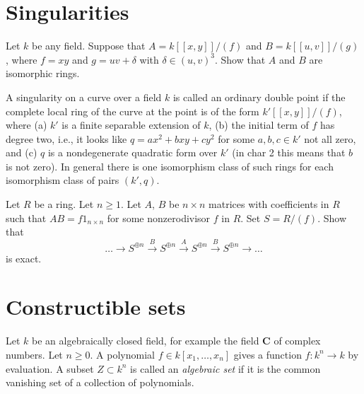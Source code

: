 \section{Singularities}
\label{section-singularities}

\begin{exercise}
\label{exercise-singularities}
Let $k$ be any field. Suppose that $A = k[[x, y]]/(f)$ and
$B = k[[u, v]]/(g)$, where $f = xy$ and $g = uv + \delta$ with
$\delta \in (u, v)^3$. Show that $A$ and $B$ are isomorphic rings.
\end{exercise}

\begin{remark}
\label{remark-singularities}
A singularity on a curve over a field $k$ is called an
ordinary double point if the complete local ring of the curve at the
point is of the form $k'[[x, y]]/(f)$, where (a) $k'$ is a finite separable
extension of $k$, (b) the initial term of $f$ has degree two, i.e., it
looks like $q = ax^2 + bxy + cy^2$ for some $a, b, c\in k'$ not all zero, and
(c) $q$ is a nondegenerate quadratic form over $k'$ (in char 2 this means that
$b$ is not zero). In general there is one isomorphism class of such rings for
each isomorphism class of pairs $(k', q)$.
\end{remark}

\begin{exercise}
\label{exercise-periodic-resolution}
Let $R$ be a ring. Let $n \geq 1$. Let $A$, $B$ be $n \times n$ matrices with
coefficients in $R$ such that $AB = f 1_{n \times n}$
for some nonzerodivisor $f$ in $R$. Set $S = R/(f)$. Show that
$$
\ldots \to
S^{\oplus n} \xrightarrow{B}
S^{\oplus n} \xrightarrow{A}
S^{\oplus n} \xrightarrow{B}
S^{\oplus n} \to \ldots
$$
is exact.
\end{exercise}







\section{Constructible sets}
\label{section-constructible}

\noindent
Let $k$ be an algebraically closed field, for example the field $\mathbf{C}$
of complex numbers. Let $n \geq 0$. A polynomial $f \in k[x_1, \ldots, x_n]$
gives a function $f : k^n \to k$ by evaluation. A subset $Z \subset k^n$
is called an {\it algebraic set} if it is the common vanishing set of a
collection of polynomials.

